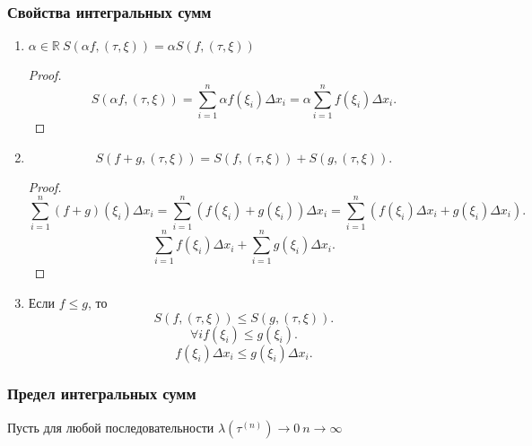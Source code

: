 \documentclass{scrartcl}
\begin{document}
\subsubsection{Свойства интегральных сумм}
\begin{enumerate}
    \item $\alpha \in \mathbb{R}~ S(\alpha f,(\tau,\xi)) = \alpha S (f,(\tau,\xi))$ 
        \begin{proof}
            \[
            S(\alpha f,(\tau,\xi)) = \sum_{i = 1}^{n} \alpha f(\xi_{i}) \Delta x_{i} = 
            \alpha \sum_{i = 1}^{n} f(\xi_{i})\Delta x_{i}
            .\] 
        \end{proof}
    \item 
        \[
        S(f + g,(\tau,\xi)) = S(f,(\tau,\xi)) + S(g,(\tau,\xi))
        .\] 
        \begin{proof}
            \[
        \sum_{i = 1}^{n} (f + g) (\xi_{i}) \Delta x_{i} =
        \sum_{i = 1}^{n} (f(\xi_{i}) + g(\xi_{i})) \Delta x_{i}=
        \sum_{i = 1}^{n} (f(\xi_{i}) \Delta x_{i} + g(\xi_{i}) \Delta x_{i}) 
            .\] 
            \[
            \sum_{i = 1}^{n} f(\xi_{i}) \Delta x_{i} +
            \sum_{i = 1} ^{n} g(\xi_{i}) \Delta x_{i}
            .\] 
        \end{proof}
\item 
    Если $f \le  g$, то
    \[
    S(f,(\tau,\xi)) \le  S(g,(\tau,\xi))
    .\] 
    \[
    \forall i f(\xi_{i}) \le g(\xi_{i})
    .\] 
    \[
    f(\xi_{i}) \Delta x_{i} \le g(\xi_{i}) \Delta x_{i}
    .\] 
\end{enumerate}
\subsubsection{Предел интегральных сумм}
Пусть  для любой последовательности $\lambda(\tau^{(n)}) \to 0 ~ n \to \infty$
\end{document}
